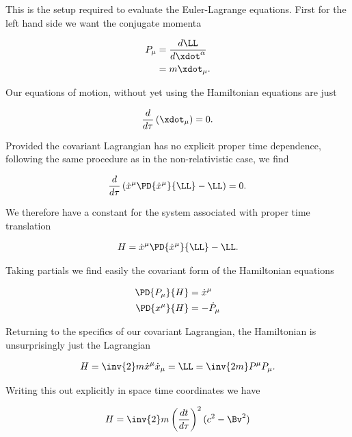 This is the setup required to evaluate the Euler-Lagrange equations.  First for the left hand side we want the conjugate momenta

\begin{align*}
P_\mu 
&= \frac{d \LL}{d \xdot^\alpha} \\
&= m \xdot_\mu.
\end{align*}

Our equations of motion, without yet using the Hamiltonian equations are just

\begin{align}\label{eqn:hamiltonian:qqq2x}
\frac{d}{d\tau} \left( \xdot_\mu \right) = 0.
\end{align}

Provided the covariant Lagrangian has no explicit proper time dependence, following the same procedure as in the non-relativistic case, we find

\begin{align}\label{eqn:hamiltonian:foo2r}
\frac{d}{d\tau} \left( \dot{x}^\mu \PD{\dot{x}^\mu}{\LL} -\LL \right) = 0.
\end{align}

We therefore have a constant for the system associated with proper time translation

\begin{align}\label{eqn:hamiltonian:foo2q}
H = \dot{x}^\mu \PD{\dot{x}^\mu}{\LL} -\LL.
\end{align}

Taking partials we find easily the covariant form of the Hamiltonian equations

\begin{align}\label{eqn:hamiltonian:qqq30}
\PD{P_\mu}{H} &= \dot{x}^\mu \\
\PD{x^\mu}{H} &= -\dot{P}_\mu 
\end{align}

Returning to the specifics of our covariant Lagrangian, the Hamiltonian is unsurprisingly just the Lagrangian

\begin{align}\label{eqn:hamiltonian:foo2s}
H = \inv{2} m \dot{x}^\mu \dot{x}_\mu = \LL = \inv{2m} P^\mu P_\mu.
\end{align}

Writing this out explicitly in space time coordinates we have

\begin{align}\label{eqn:hamiltonian:qqq10}
H = \inv{2} m
\left( \frac{dt}{d\tau} \right)^2
(c^2 - \Bv^2)
\end{align}


